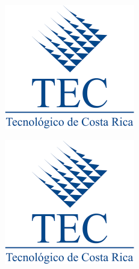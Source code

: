 \documentclass[letterpaper, 10pt, journal]{IEEEtran}
\begin{document}
\begin{minipage}[b]{0.15\textwidth}
\includegraphics[width=\textwidth]{tec-logo}
\end{minipage}
\begin{minipage}[t]{0.15\textwidth}
\includegraphics[width=\textwidth]{tec-logo}
\end{minipage}
\end{document}
